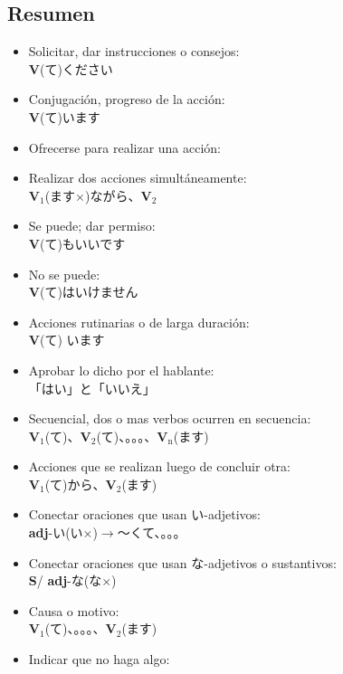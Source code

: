 \documentclass[a4paper,12pt,oneside]{report}
\def\to{$\longrightarrow$}
\def\bv{\textbf{V}} %
\def\bs{\textbf{S}} %
\def\adj{\textbf{adj}} %
\def\vi{$\mathrm{\bv}_1$} %
\def\vn{$\mathrm{\bv}_2$} %
\def\vene{$\mathrm{\bv}_\mathrm{n}$} %
\def\tenten{。。。}
\begin{document}
\begin{CJK*}{UTF8}{min}

\chapter{Resumen}
  \thispagestyle{contenido} %
  \pagestyle{contenido}     %

  \begin{itemize}
    \item Solicitar, dar instrucciones o consejos:\\
          \bv(て)ください
    \item Conjugaci\'on, progreso de la acci\'on:\\
          \bv(て)います
    \item Ofrecerse para realizar una acci\'on:\\
    \item Realizar dos acciones simultáneamente:\\
          \vi(ます×)ながら、\vn
    \item Se puede; dar permiso:\\
          \bv(て)もいいです
    \item No se puede:\\
          \bv(て)はいけません
    \item Acciones rutinarias o de larga duraci\'on:\\
          \bv(て) います
    \item Aprobar lo dicho por el hablante:\\
          「はい」と「いいえ」
    \item Secuencial, dos o mas verbos ocurren en secuencia:\\
          \vi(て)、\vn(て)、\tenten、\vene(ます)
    \item Acciones que se realizan luego de concluir otra:\\
          \vi(て)から、\vn(ます)
    \item Conectar oraciones que usan い-adjetivos:\\
          \adj-い(い×)\to〜くて、\tenten
    \item Conectar oraciones que usan な-adjetivos o sustantivos:\\
          \bs / \adj-な(な×)
    \item Causa o motivo:\\
          \vi(て)、\tenten、\vn(ます)
    \item Indicar que no haga algo:\\

\end{itemize}
\end{CJK*}
\end{document}
